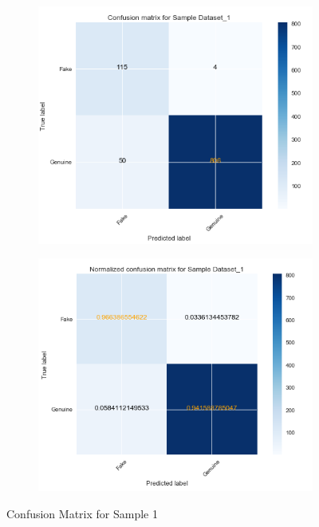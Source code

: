 \documentclass[a4paper, 12pt]{report}
\begin{document}
\begin{figure}[h!]
	\centering
	\begin{subfigure}{0.45\linewidth}
		\centering
		\includegraphics[width =\linewidth]{matrix_1}
	\end{subfigure}%
	\begin{subfigure}{0.45\linewidth}
		\centering
		\includegraphics[width =\linewidth]{matrix_nor_1}
	\end{subfigure}
	\caption{Confusion Matrix for Sample 1}
\end{figure}
\end{document}
